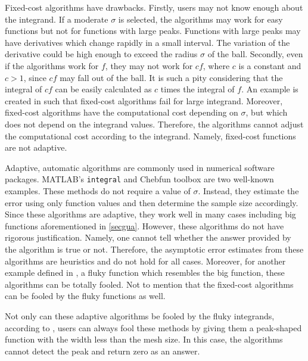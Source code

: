 \documentclass{iitthesis}
\theoremstyle{definition}
\theoremstyle{remark}
\begin{document}
Fixed-cost algorithms have drawbacks. Firstly, users may not know enough about the integrand. If a moderate $\sigma$ is selected, the algorithms may work for easy functions but not for functions with large peaks. Functions with large peaks may have derivatives which change rapidly in a small interval. The variation of the derivative could be high enough to exceed the radius $\sigma$ of the ball. Secondly, even if the algorithms work for $f$, they may not work for $cf$, where $c$ is a constant and $c>1$, since $cf$ may fall out of the ball. It is such a pity considering that the integral of $cf$ can be easily calculated as $c$ times the integral of $f$. An example is created in \cite[(10)]{HicRazYun15a} such that fixed-cost algorithms fail for large integrand. Moreover, fixed-cost algorithms have the computational cost depending on $\sigma$, but which does not depend on the integrand values. Therefore, the algorithms cannot adjust the computational cost according to the integrand. Namely, fixed-cost functions are not adaptive.

\label{secada}

Adaptive, automatic algorithms are commonly used in numerical software packages. MATLAB's {\tt integral} and Chebfun toolbox are two well-known examples. These methods do not require a value of $\sigma$. Instead, they estimate the error using only function values and then determine the sample size accordingly. Since these algorithms are adaptive, they work well in many cases including big functions aforementioned in \ref{secgua}. However, these algorithms do not have rigorous justification. Namely, one cannot tell whether the answer provided by the algorithm is true or not. Therefore, the asymptotic error estimates from these algorithms are heuristics and do not hold for all cases. Moreover, for another example defined in \cite[(13)]{HicRazYun15a}, a fluky function which resembles the big function, these algorithms can be totally fooled. Not to mention that the fixed-cost algorithms can be fooled by the fluky functions as well.

Not only can these adaptive algorithms be fooled by the fluky integrands, according to \cite{Lyn83}, users can always fool these methods by giving them a peak-shaped function with the width less than the mesh size. In this case, the algorithms cannot detect the peak and return zero as an answer.

\end{document}
